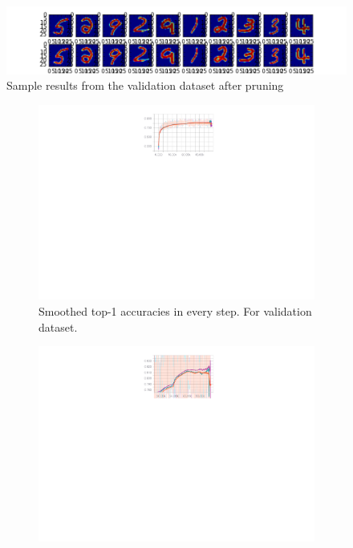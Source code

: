 \begin{figure}[h]
\centering
\includegraphics[width=1\linewidth]{images/autoencoder_pruned.png}
\caption{Sample results from the validation dataset after pruning}
\label{fig:autoencoder_results}
\end{figure}

\begin{figure}
  \vspace{-45px}
  \centering
  \begin{subfigure}{.79\textwidth}
        \includegraphics[width=1\linewidth]{images/convolution-comparison-test-dataset-full-accuracy.pdf}
        \caption{Smoothed top-1 accuracies in every step. For validation dataset.}
        \label{fig:conv-comparison-full}
  \end{subfigure}
  \begin{subfigure}{.79\textwidth}
        \includegraphics[width=1\linewidth]{images/convolution-comparison-test-dataset-accuracy-zoomed.pdf}

\end{subfigure}
\end{figure}
